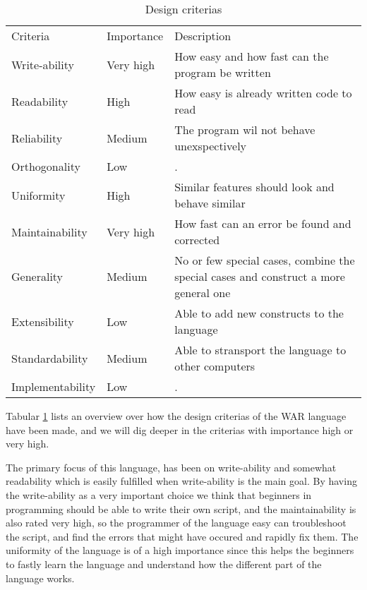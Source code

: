 \begin{table}[H]
	\begin{tabular}{| 	l		 l		 p{7cm}			|}
	Criteria			&	Importance	&		Description	\\		
	Write-ability 		& 	Very high	&		How easy and how fast can the program be written\\
	Readability			& 	High		&		How easy is already written code to read\\
	Reliability			& 	Medium		&		The program wil not behave unexspectively\\
	Orthogonality		& 	Low			&		.\\
	Uniformity			& 	High		&		Similar features should look and behave similar\\
	Maintainability		& 	Very high	&		How fast can an error be found and corrected\\
	Generality			& 	Medium		&		No or few special cases, combine the special cases and construct a more general one\\
	Extensibility		& 	Low			&		Able to add new constructs to the language\\
	Standardability		& 	Medium		&		Able to stransport the language to other computers\\
	Implementability	& 	Low			&		.\\
	\end{tabular}
	\caption{Design criterias}
	\label{tab:criteria_tabular}
\end{table}


Tabular \ref{tab:criteria_tabular} lists an overview over how the design criterias of the WAR language have been made, and we will dig deeper in the criterias with importance high or very high.

The primary focus of this language, has been on write-ability and somewhat readability which is easily fulfilled when write-ability is the main goal. By having the write-ability as a very important choice we think that beginners in programming should be able to write their own script, and the maintainability is also rated very high, so the programmer of the language easy can troubleshoot the script, and find the errors that might have occured and rapidly fix them. The uniformity of the language is of a high importance since this helps the beginners to fastly learn the language and understand how the different part of the language works.


